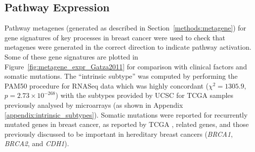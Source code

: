 \subsection{Pathway Expression} \label{chapt3:metagene_expression}

Pathway metagenes (generated as described in Section~\ref{methods:metagene}) for gene signatures of key processes in breast cancer \citep{Gatza2011} were used to check that metagenes were generated in the correct direction to indicate pathway activation. Some of these gene signatures are plotted in Figure~\ref{fig:metagene_expr_Gatza2011} for comparison with clinical factors and somatic mutations. The ``intrinsic subtype''  was computed by performing the PAM50 procedure \cite{Parker2009} for RNASeq data which was highly concordant ($\chi^2 = 1305.9$, $p = 2.73 \times 10^{-268}$) with the subtypes provided by UCSC for TCGA samples  \citep{TCGA2012} previously analysed by microarrays (as shown in Appendix \ref{appendix:intrinsic_subtypes}). Somatic mutations were reported for recurrently mutated genes in breast cancer, as reported by TCGA \citep{TCGA2012}, related genes, and those previously discussed to be important in hereditary breast cancers (\textit{BRCA1}, \textit{BRCA2}, and \textit{CDH1}).

